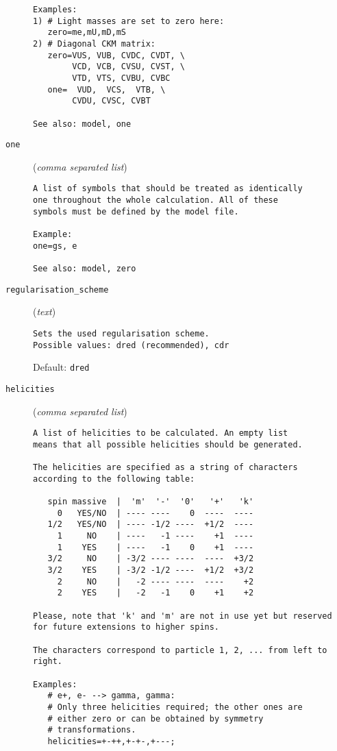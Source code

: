 \begin{description}
\begin{verbatim}
Examples:
1) # Light masses are set to zero here:
   zero=me,mU,mD,mS
2) # Diagonal CKM matrix:
   zero=VUS, VUB, CVDC, CVDT, \
        VCD, VCB, CVSU, CVST, \
        VTD, VTS, CVBU, CVBC
   one=  VUD,  VCS,  VTB, \
        CVDU, CVSC, CVBT

See also: model, one
\end{verbatim}
\item[\texttt{one}] (\textit{comma separated list})
\begin{verbatim}
A list of symbols that should be treated as identically
one throughout the whole calculation. All of these
symbols must be defined by the model file.

Example:
one=gs, e

See also: model, zero
\end{verbatim}
\item[\texttt{regularisation\_scheme}] (\textit{text})
\begin{verbatim}
Sets the used regularisation scheme.
Possible values: dred (recommended), cdr
\end{verbatim}
Default: \verb|dred|
\item[\texttt{helicities}] (\textit{comma separated list})
\begin{verbatim}
A list of helicities to be calculated. An empty list
means that all possible helicities should be generated.

The helicities are specified as a string of characters
according to the following table:

   spin massive  |  'm'  '-'  '0'   '+'   'k'
     0   YES/NO  | ---- ----    0  ----  ----
   1/2   YES/NO  | ---- -1/2 ----  +1/2  ----
     1     NO    | ----   -1 ----    +1  ----
     1    YES    | ----   -1    0    +1  ----
   3/2     NO    | -3/2 ---- ----  ----  +3/2
   3/2    YES    | -3/2 -1/2 ----  +1/2  +3/2
     2     NO    |   -2 ---- ----  ----    +2
     2    YES    |   -2   -1    0    +1    +2

Please, note that 'k' and 'm' are not in use yet but reserved
for future extensions to higher spins.

The characters correspond to particle 1, 2, ... from left to
right.

Examples:
   # e+, e- --> gamma, gamma:
   # Only three helicities required; the other ones are
   # either zero or can be obtained by symmetry
   # transformations.
   helicities=+-++,+-+-,+---;


\end{verbatim}
\end{description}
